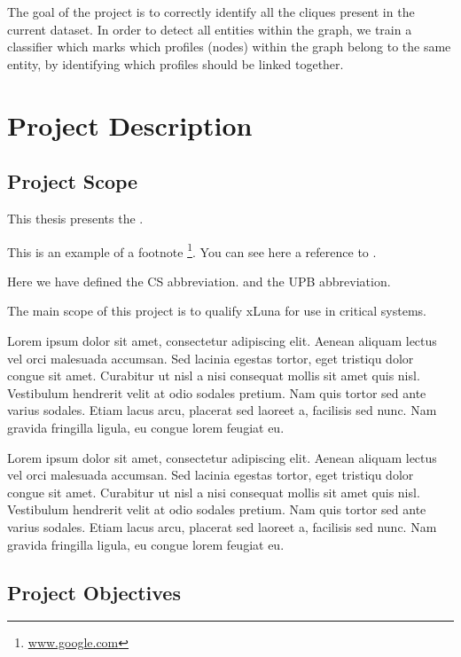 The goal of the project is to correctly identify all the cliques present in the
current dataset. In order to detect all entities within the graph, we train a classifier
which marks which profiles (nodes) within the graph belong to the same entity,
by identifying which profiles should be linked together.

\section{Project Description}
\label{sec:proj}

\subsection{Project Scope}
\label{sub-sec:proj-scope}

This thesis presents the \textbf{\project}.

This is an example of a footnote \footnote{\url{www.google.com}}. You can see here a reference to .

Here we have defined the CS abbreviation. and the UPB abbreviation.

The main scope of this project is to qualify xLuna for use in critical systems.


Lorem ipsum dolor sit amet, consectetur adipiscing elit. Aenean aliquam lectus vel orci malesuada accumsan. Sed lacinia egestas tortor, eget tristiqu dolor congue sit amet. Curabitur ut nisl a nisi consequat mollis sit amet quis nisl. Vestibulum hendrerit velit at odio sodales pretium. Nam quis tortor sed ante varius sodales. Etiam lacus arcu, placerat sed laoreet a, facilisis sed nunc. Nam gravida fringilla ligula, eu congue lorem feugiat eu.

Lorem ipsum dolor sit amet, consectetur adipiscing elit. Aenean aliquam lectus vel orci malesuada accumsan. Sed lacinia egestas tortor, eget tristiqu dolor congue sit amet. Curabitur ut nisl a nisi consequat mollis sit amet quis nisl. Vestibulum hendrerit velit at odio sodales pretium. Nam quis tortor sed ante varius sodales. Etiam lacus arcu, placerat sed laoreet a, facilisis sed nunc. Nam gravida fringilla ligula, eu congue lorem feugiat eu.


\subsection{Project Objectives}
\label{sub-sec:proj-objectives}

